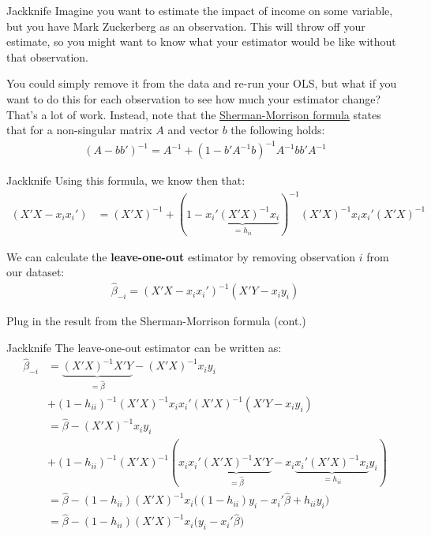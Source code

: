 \begin{frame}{Jackknife}
    Imagine you want to estimate the impact of income on some variable, but you have Mark Zuckerberg as an observation. This will throw off your estimate, so you might want to know what your estimator would be like without that observation.

    \vspace{2em}
    
    You could simply remove it from the data and re-run your OLS, but what if you want to do this for each observation to see how much your estimator change? That's a lot of work. Instead, note that the \href{https://en.wikipedia.org/wiki/Sherman-Morrison_formula}{\underline{Sherman-Morrison formula}} states that for a non-singular matrix $A$ and vector $b$ the following holds:
    \begin{align*}
        (A - bb')^{-1} = A^{-1} + (1 - b'A^{-1}b)^{-1} A^{-1} bb' A^{-1}    
    \end{align*}

\end{frame}

\begin{frame}{Jackknife}
    Using this formula, we know then that:
    \begin{align*}
        (X'X - x_ix_i') &= (X'X)^{-1} + (1 - \underbrace{x_i' (X'X)^{-1} x_i}_{= h_{ii}})^{-1} (X'X)^{-1} x_i x_i' (X'X)^{-1}
    \end{align*}

    We can calculate the \textbf{leave-one-out} estimator by removing observation $i$ from our dataset:
    \begin{align*}
        \hat{\beta}_{-i} = (X'X - x_i x_i')^{-1} (X' Y - x_i y_i)
    \end{align*}

    Plug in the result from the Sherman-Morrison formula (cont.)

\end{frame}

\begin{frame}{Jackknife}
    The leave-one-out estimator can be written as:
    \begin{align*}
        \hat{\beta}_{-i} &= \underbrace{(X'X)^{-1} X' Y}_{= \hat{\beta}} - (X'X)^{-1} x_i y_i
        \\
        &+  (1 -h_{ii})^{-1} (X'X)^{-1} x_i x_i' (X'X)^{-1} (X' Y - x_i y_i)
        \\
        &= \hat{\beta} - (X'X)^{-1} x_i y_i
        \\
        &+ (1 - h_{ii})^{-1} (X' X)^{-1} (x_i x_i' \underbrace{(X'X)^{-1} X' Y}_{= \hat{\beta}} - x_i \underbrace{x_i' (X'X)^{-1} x_i}_{= h_{ii}} y_i)
        \\
        &= \hat{\beta} - (1 - h_{ii}) (X'X)^{-1} x_i \Biggr((1 - h_{ii})y_i - x_i' \hat{\beta} + h_{ii} y_i \Biggr)
        \\
        &= \hat{\beta} - (1 - h_{ii}) (X'X)^{-1} x_i \Biggr(y_i - x_i' \hat{\beta} \Biggr)
    \end{align*}

\end{frame}

